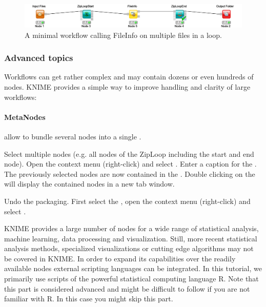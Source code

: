\begin{figure}
\centering
\includegraphics[width=\textwidth]{graphics/knime_setup/Minimal_FileInfoLoop}
\caption{A minimal workflow calling FileInfo on multiple files in a loop.}
\label{fig:knime_minimal_loop}
\end{figure}

\subsubsection{Advanced topics}

Workflows can get rather complex and may contain dozens or even hundreds of nodes. KNIME provides a simple way to improve handling and clarity of large workflows:

\paragraph{MetaNodes} allow to bundle several nodes into a single .

\begin{task}
Select multiple nodes (e.g. all nodes of the ZipLoop including the start and end node). Open the context menu (right-click) and select . Enter a caption for the . The previously selected nodes are now contained in the . Double clicking on the  will display the contained nodes in a new tab window. 
\end{task}

\begin{task}
Undo the packaging. First select the , open the context menu (right-click) and select .
\end{task}

KNIME provides a large number of nodes for a wide range of statistical analysis, machine learning, data processing and visualization. Still, more recent statistical analysis methods, specialized visualizations or cutting edge algorithms may not be covered in KNIME. In order to expand its capabilities over the readily available nodes external scripting languages can be integrated. In this tutorial, we primarily use scripts of the powerful statistical computing language R. Note that this part is considered advanced and might be difficult to follow if you are not familiar with R. In this case you might skip this part.

